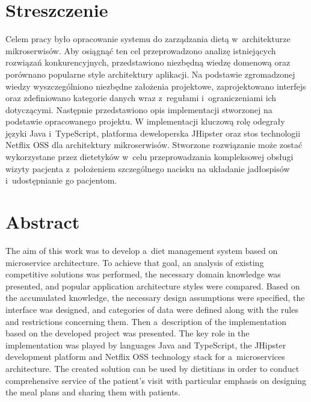 \chapter*{Streszczenie} %
Celem pracy było opracowanie systemu do zarządzania dietą w~architekturze mikroserwisów.
Aby osiągnąć ten cel przeprowadzono analizę istniejących rozwiązań konkurencyjnych, przedstawiono niezbędną wiedzę domenową oraz porównano popularne style architektury aplikacji.
Na podstawie zgromadzonej wiedzy wyszczególniono niezbędne założenia projektowe, zaprojektowano interfejs oraz zdefiniowano kategorie danych wraz z~regułami i~ograniczeniami ich dotyczącymi.
Następnie przedstawiono opis implementacji stworzonej na podstawie opracowanego projektu.
W implementacji kluczową rolę odegrały języki Java\cite{tech:java} i~TypeScript\cite{tech:typescript}, platforma deweloperska JHipster\cite{tech:jhipster} oraz stos technologii Netflix OSS\cite{tech:netflix-oss} dla architektury mikroserwisów.
Stworzone rozwiązanie może zostać wykorzystane przez dietetyków w~celu przeprowadzania kompleksowej obsługi wizyty pacjenta z~położeniem szczególnego nacisku na układanie jadłospisów i~udostępnianie go pacjentom.


\begingroup
\renewcommand{\cleardoublepage}{}
\renewcommand{\clearpage}{}
\chapter*{Abstract} %
The aim of this work was to develop a~diet management system based on microservice architecture.
To achieve that goal, an analysis of existing competitive solutions was performed, the necessary domain knowledge was presented, and popular application architecture styles were compared.
Based on the accumulated knowledge, the necessary design assumptions were specified, the interface was designed, and categories of data were defined along with the rules and restrictions concerning them.
Then a~description of the implementation based on the developed project was presented.
The key role in the implementation was played by languages Java\cite{tech:java} and TypeScript\cite{tech:typescript}, the JHipster\cite{tech:jhipster} development platform and Netflix OSS\cite{tech:netflix-oss} technology stack for a~microservices architecture.
The created solution can be used by dietitians in order to conduct comprehensive service of the patient's visit with particular emphasis on designing the meal plans and sharing them with patients.
\endgroup
{}
